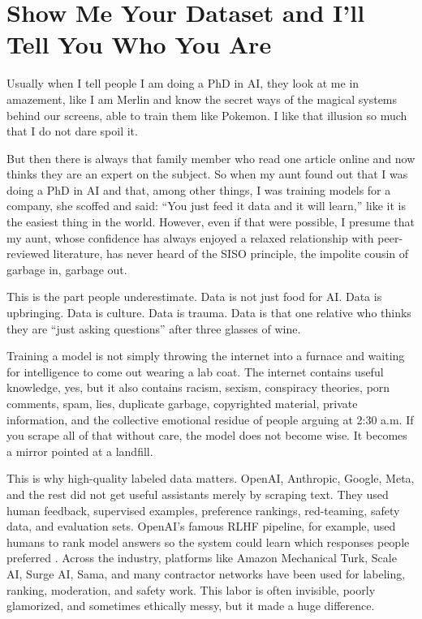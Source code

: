 \documentclass[12pt,oneside]{book}
\begin{document}
\chapter{Show Me Your Dataset and I'll Tell You Who You Are}

Usually when I tell people I am doing a PhD in AI, they look at me in amazement, like I am Merlin and know the secret ways of the magical systems behind our screens, able to train them like Pokemon. I like that illusion so much that I do not dare spoil it.

But then there is always that family member who read one article online and now thinks they are an expert on the subject. So when my aunt found out that I was doing a PhD in AI and that, among other things, I was training models for a company, she scoffed and said: ``You just feed it data and it will learn,'' like it is the easiest thing in the world. However, even if that were possible, I presume that my aunt, whose confidence has always enjoyed a relaxed relationship with peer-reviewed literature, has never heard of the SISO principle, the impolite cousin of garbage in, garbage out.

This is the part people underestimate. Data is not just food for AI. Data is upbringing. Data is culture. Data is trauma. Data is that one relative who thinks they are ``just asking questions'' after three glasses of wine.

Training a model is not simply throwing the internet into a furnace and waiting for intelligence to come out wearing a lab coat. The internet contains useful knowledge, yes, but it also contains racism, sexism, conspiracy theories, porn comments, spam, lies, duplicate garbage, copyrighted material, private information, and the collective emotional residue of people arguing at 2:30 a.m. If you scrape all of that without care, the model does not become wise. It becomes a mirror pointed at a landfill.

This is why high-quality labeled data matters. OpenAI, Anthropic, Google, Meta, and the rest did not get useful assistants merely by scraping text. They used human feedback, supervised examples, preference rankings, red-teaming, safety data, and evaluation sets. OpenAI's famous RLHF pipeline, for example, used humans to rank model answers so the system could learn which responses people preferred \parencite{ouyang2022}. Across the industry, platforms like Amazon Mechanical Turk, Scale AI, Surge AI, Sama, and many contractor networks have been used for labeling, ranking, moderation, and safety work. This labor is often invisible, poorly glamorized, and sometimes ethically messy, but it made a huge difference.
\end{document}
